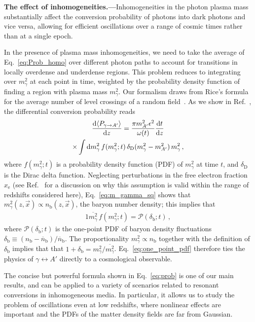 \documentclass[prd,aps,10pt,nofootinbib,twocolumn,superscriptaddress,preprintnumbers,balancelastpage,longbibliography]{revtex4-1}
\begin{document}
\noindent
{\bf The effect of inhomogeneities.---}Inhomogeneities in the photon plasma mass substantially affect the conversion probability of photons into dark photons and vice versa, allowing for efficient oscillations over a range of cosmic times rather than at a single epoch.

In the presence of plasma mass inhomogeneities, we need to take the average of Eq.~\eqref{eq:Prob_homo} over different photon paths to account for transitions in locally overdense and underdense regions. This problem reduces to integrating over $m_\gamma^2$ at each point in time, weighted by the probability density function of finding a region with plasma mass $m_\gamma^2$. Our formalism draws from Rice's formula for the average number of level crossings of a random field~\cite{Lindgren2}.  As we show in Ref.~\cite{OurLongPaper}, the differential conversion probability reads 
%
\begin{multline} 
    \label{eq:prob}
    \frac{\mathrm{d}\langle P_{\gamma \to A'} \rangle}{\mathrm{d} z} =  \frac{\pi m_{A^\prime}^2 \epsilon^2}{\omega(t)} \frac{\mathrm{d} t}{\mathrm{d} z} \\ \times  \int \mathrm{d} m_\gamma^2  \, f(m_\gamma^2;t) \, \delta_\mathrm{D}(m_\gamma^2 - m_{A^\prime}^2) \, m_\gamma^2  \,,
\end{multline}
%
where $f(m_\gamma^2;t)$ is a probability density function (PDF) of $m_\gamma^2$ at time $t$, and $\delta_\mathrm{D}$ is the Dirac delta function. Neglecting perturbations in the free electron fraction $x_\mathrm{e}$ (see Ref.~\cite{OurLongPaper} for a discussion on why this assumption is valid within the range of redshifts considered here), Eq.~\eqref{eq:m_gamma_sq} shows that $m_\gamma^2(z,\vec{x}) \propto n_\mathrm{b}(z,\vec{x})$, the baryon number density; this implies that
%
\begin{alignat}{1}
    \overline{m_\gamma^2} \, f(m_\gamma^2; t) = \mathcal{P}(\delta_\mathrm{b};t) \,,
    \label{eq:one_point_pdf}
\end{alignat}
%
where $\mathcal{P}(\delta_\mathrm{b};t)$ is the one-point PDF of baryon density fluctuations $\delta_\mathrm{b} \equiv (n_\mathrm{b} - \overline{n}_\mathrm{b}) / \overline{n}_\mathrm{b}$. The proportionality $m_\gamma^2 \propto n_\mathrm{b}$ together with the definition of $\delta_\mathrm{b}$ implies that that $1 + \delta_\mathrm{b} = m_\gamma^2 / \overline{m_\gamma^2}$. Eq.~\eqref{eq:one_point_pdf} therefore ties the physics of $\gamma \leftrightarrow A'$ directly to a cosmological observable.

The concise but powerful formula shown in Eq.~\eqref{eq:prob} is one of our main results, and can be applied to a variety of scenarios related to resonant conversions in inhomogeneous media. In particular, it allows us to study the problem of oscillations even at low redshifts, where nonlinear effects are important and the PDFs of the matter density fields are far from Gaussian. 
\end{document}
